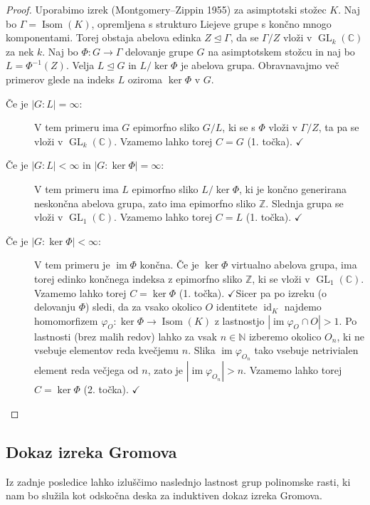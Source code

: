 \documentclass[11pt]{book}
\def\NN{\mathbb{N}}
\def\ZZ{\mathbb{Z}}
\def\CC{\mathbb{C}}
\DeclareMathOperator\image{im}
\DeclareMathOperator\GL{GL}
\DeclareMathOperator\Isom{Isom}
\DeclareMathOperator\id{id}
\def\vprasanje{\color{oranzna}}
\def\literatura{\color{modra}}
\def\kljuka{$\checkmark$}
\theoremstyle{definition}
\theoremstyle{zgled}
\theoremstyle{odprtproblem}
\theoremstyle{domacanaloga}
\newenvironment{dokaz}
    {\color{siva}\begin{proof}}
    {\end{proof}}
\theoremstyle{izrek}
\begin{document}
\begin{dokaz}
Uporabimo izrek {\literatura (Montgomery--Zippin 1955)} za asimptotski stožec $K$. Naj bo $\Gamma = \Isom(K)$, opremljena s strukturo Liejeve grupe s končno mnogo komponentami. Torej obstaja abelova edinka $Z \unlhd \Gamma$, da se $\Gamma/Z$ vloži v $\GL_k(\CC)$ za nek $k$. Naj bo $\Phi \colon G \to \Gamma$ delovanje grupe $G$ na asimptotskem stožcu in naj bo $L = \Phi^{-1}(Z)$. Velja $L \unlhd G$ in $L/\ker \Phi$ je abelova grupa. Obravnavajmo več primerov glede na indeks $L$ oziroma $\ker \Phi$ v $G$.

\begin{description}
    \item[Če je $|G : L| = \infty$:] V tem primeru ima $G$ epimorfno sliko $G/L$, ki se s $\Phi$ vloži v $\Gamma/Z$, ta pa se vloži v $\GL_k(\CC)$. Vzamemo lahko torej $C = G$ (1. točka). \kljuka

    \item[Če je $|G : L| < \infty$ in $|G : \ker \Phi| = \infty$:] V tem primeru ima $L$ epimorfno sliko $L/\ker\Phi$, ki je končno generirana neskončna abelova grupa, zato ima epimorfno sliko $\ZZ$. Slednja grupa se vloži v $\GL_1(\CC)$. Vzamemo lahko torej $C = L$ (1. točka). \kljuka

    \item[Če je $|G : \ker \Phi| < \infty$:] V tem primeru je $\image \Phi$ končna. Če je $\ker \Phi$ virtualno abelova grupa, ima torej edinko končnega indeksa z epimorfno sliko $\ZZ$, ki se vloži v $\GL_1(\CC)$. Vzamemo lahko torej $C = \ker \Phi$ (1. točka). \kljuka Sicer pa po izreku {\sc (o delovanju $\Phi$)} sledi, da za vsako okolico $O$ identitete $\id_K$ najdemo homomorfizem $\varphi_O \colon \ker \Phi \to \Isom(K)$ z lastnostjo $|\image \varphi_O \cap O| > 1$. Po lastnosti {\vprasanje (brez malih redov)} lahko za vsak $n \in \NN$ izberemo okolico $O_n$, ki ne vsebuje elementov reda kvečjemu $n$. Slika $\image \varphi_{O_n}$ tako vsebuje netrivialen element reda večjega od $n$, zato je $|\image \varphi_{O_n}| > n$. Vzamemo lahko torej $C = \ker \Phi$ (2. točka). \kljuka
\end{description}\vspace{-1.5\baselineskip}
\end{dokaz}

\subsection{Dokaz izreka Gromova}

Iz zadnje posledice lahko izluščimo naslednjo lastnost grup polinomske rasti, ki nam bo služila kot odskočna deska za induktiven dokaz izreka Gromova.
\end{document}
